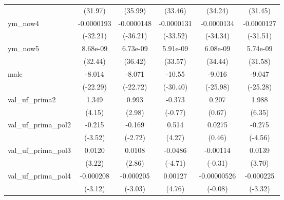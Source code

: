 {\begin{tabular}{l*{5}{c}}
                    &     (31.97)         &     (35.99)         &     (33.46)         &     (34.24)         &     (31.45)         \\
ym\_now4             &  -0.0000193\sym{***}&  -0.0000148\sym{***}&  -0.0000131\sym{***}&  -0.0000134\sym{***}&  -0.0000127\sym{***}\\
                    &    (-32.21)         &    (-36.21)         &    (-33.52)         &    (-34.34)         &    (-31.51)         \\
ym\_now5             &    8.68e-09\sym{***}&    6.73e-09\sym{***}&    5.91e-09\sym{***}&    6.08e-09\sym{***}&    5.74e-09\sym{***}\\
                    &     (32.44)         &     (36.42)         &     (33.57)         &     (34.44)         &     (31.58)         \\
male                &      -8.014\sym{***}&      -8.071\sym{***}&      -10.55\sym{***}&      -9.016\sym{***}&      -9.047\sym{***}\\
                    &    (-22.29)         &    (-22.72)         &    (-30.40)         &    (-25.98)         &    (-25.28)         \\
val\_uf\_prima2       &       1.349\sym{***}&       0.993\sym{**} &      -0.373         &       0.207         &       1.988\sym{***}\\
                    &      (4.15)         &      (2.98)         &     (-0.77)         &      (0.67)         &      (6.35)         \\
val\_uf\_prima\_pol2   &      -0.215\sym{***}&      -0.169\sym{**} &       0.514\sym{***}&      0.0275         &      -0.275\sym{***}\\
                    &     (-3.52)         &     (-2.72)         &      (4.27)         &      (0.46)         &     (-4.56)         \\
val\_uf\_prima\_pol3   &      0.0120\sym{**} &      0.0108\sym{**} &     -0.0486\sym{***}&    -0.00114         &      0.0139\sym{***}\\
                    &      (3.22)         &      (2.86)         &     (-4.71)         &     (-0.31)         &      (3.70)         \\
val\_uf\_prima\_pol4   &   -0.000208\sym{**} &   -0.000205\sym{**} &     0.00127\sym{***}& -0.00000526         &   -0.000225\sym{***}\\
                    &     (-3.12)         &     (-3.03)         &      (4.76)         &     (-0.08)         &     (-3.32)         \\

\end{tabular}}
